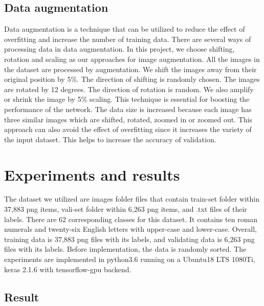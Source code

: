 \documentclass[twoside,twocolumn]{article}
\begin{document}
\subsection{Data augmentation}

Data augmentation is a technique that can be utilized to reduce the effect of overfitting and increase the number of training data. There are several ways of processing data in data augmentation. In this project, we choose shifting, rotation and scaling as our approaches for image augmentation. All the images in the dataset are processed by augmentation. We shift the images away from their original position by 5\%. The direction of shifting is randomly chosen. The images are rotated by 12 degrees. The direction of rotation is random. We also amplify or shrink the image by 5\% scaling. This technique is essential for boosting the performance of the network. The data size is increased because each image has three similar images which are shifted, rotated, zoomed in or zoomed out. This approach can also avoid the effect of overfitting since it increases the variety of the input dataset. This helps to increase the accuracy of validation. 

\section{Experiments and results}

The dataset we utilized are images folder files that contain train-set folder within 37,883 png items, vali-set folder within 6,263 png items, and .txt files of their labels. There are 62 corresponding classes for this dataset. It contains ten roman numerals and twenty-six English letters  with upper-case and lower-case. Overall, training data is 37,883 png files with its labels, and validating data is 6,263 png files with its labels. Before implementation, the data is randomly sorted. The experiments are implemented in python3.6 running on a Ubuntu18 LTS 1080Ti, keras 2.1.6 with tensorflow-gpu backend.

\subsection{Result}
\end{document}
